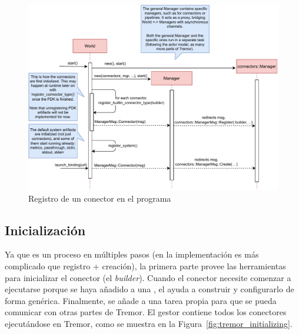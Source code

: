\begin{figure}
    \centering
    \includegraphics[width=\textwidth]{./Imagenes/registering.pdf}
    \caption{Registro de un conector en el programa}%
    \label{fig:tremor_registering}
\end{figure}

\subsection{Inicialización}

Ya que es un proceso en múltiples pasos (en la implementación es más complicado
que registro + creación), la primera parte provee las herramientas para
inicializar el conector (el \emph{builder}). Cuando el conector necesite
comenzar a ejecutarse porque se haya añadido a una \pipeline, el \builder ayuda
a construir y configurarlo de forma genérica. Finalmente, se añade a una tarea
propia para que se pueda comunicar con otras partes de Tremor. El gestor
 contiene todos los conectores ejecutándose en Tremor,
como se muestra en la Figura~\ref{fig:tremor_initializing}.

